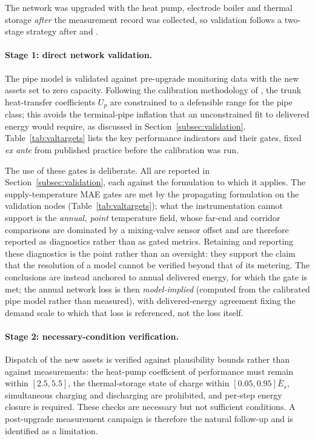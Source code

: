 
The network was upgraded with the heat pump, electrode boiler and thermal storage
\emph{after} the measurement record was collected, so validation follows a two-stage
strategy after \citet{Kus2025} and \citet{Maldonado2024}.

\paragraph{Stage 1: direct network validation.}
The pipe model is validated against pre-upgrade monitoring data with the new assets set to
zero capacity. Following the calibration methodology of \citet{Maldonado2024}, the trunk
heat-transfer coefficients $U_p$ are constrained to a defensible range for the pipe class;
this avoids the terminal-pipe inflation that an unconstrained fit to delivered energy would
require, as discussed in Section~\ref{subsec:validation}. Table~\ref{tab:valtargets} lists
the key performance indicators and their gates, fixed \emph{ex ante} from published practice
before the calibration was run.

The use of these gates is deliberate. All are reported in
Section~\ref{subsec:validation}, each against the formulation to which it applies. The
supply-temperature MAE gates are met by the propagating formulation on the validation nodes
(Table~\ref{tab:valtargets}); what the instrumentation cannot support is the \emph{annual,
point} temperature field, whose far-end and corridor comparisons are dominated by a
mixing-valve sensor offset and are therefore reported as diagnostics rather than as gated
metrics. Retaining and reporting these diagnostics is the point rather than an oversight:
they support the claim that the resolution of a model cannot be verified beyond that of its
metering. The conclusions are instead anchored to annual delivered energy, for which the gate
is met; the annual network loss is then \emph{model-implied} (computed from the calibrated
pipe model rather than measured), with delivered-energy agreement fixing the demand scale to
which that loss is referenced, not the loss itself.

\paragraph{Stage 2: necessary-condition verification.}
Dispatch of the new assets is verified against plausibility bounds rather than against
measurements: the heat-pump coefficient of performance must remain within \([2.5,5.5]\),
the thermal-storage state of charge within \([0.05,0.95]\bar{E}_s\), simultaneous charging
and discharging are prohibited, and per-step energy closure is required. These checks are
necessary but not sufficient conditions. A post-upgrade measurement campaign is therefore
the natural follow-up and is identified as a limitation.

